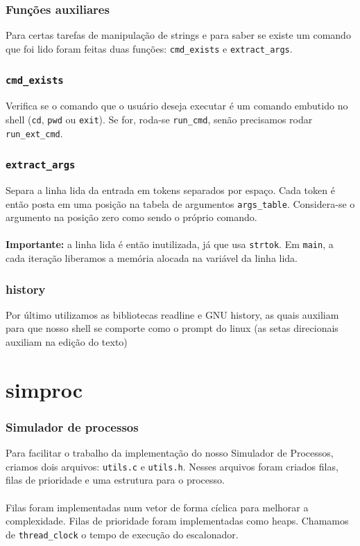 \documentclass{beamer}
\begin{document}
\begin{frame}
  \frametitle{Funções auxiliares}
  Para certas tarefas de manipulação de strings e para saber se existe um comando que foi lido foram feitas duas funções: \texttt{cmd\_exists} e \texttt{extract\_args}. 
\end{frame}


\begin{frame}
  \frametitle{\texttt{cmd\_exists}}
  Verifica se o comando que o usuário deseja executar é um comando embutido no shell (\texttt{cd}, \texttt{pwd} ou \texttt{exit}). Se for, roda-se \texttt{run\_cmd}, senão precisamos rodar \texttt{run\_ext\_cmd}.
\end{frame}


\begin{frame}
  \frametitle{\texttt{extract\_args}}
  Separa a linha lida da entrada em tokens separados por espaço. Cada token é então posta em uma posição na tabela de argumentos \texttt{args\_table}. Considera-se o argumento na posição zero como sendo o próprio comando. \\~\\
  
  \textbf{Importante:} a linha lida é então inutilizada, já que usa \texttt{strtok}. Em \texttt{main}, a cada iteração liberamos a memória alocada na variável da linha lida.
\end{frame}

\begin{frame}
    \frametitle{history}
    Por último utilizamos as bibliotecas readline e GNU history, as quais auxiliam para que nosso shell se comporte como o prompt do linux (as setas direcionais auxiliam na edição do texto)

\end{frame}

\section{simproc}

\begin{frame}
  \frametitle{Simulador de processos}
  Para facilitar o trabalho da implementação do nosso Simulador de Processos, criamos dois arquivos: \texttt{utils.c} e \texttt{utils.h}. Nesses arquivos foram criados filas, filas de prioridade e uma estrutura para o processo. \\~\\

  Filas foram implementadas num vetor de forma cíclica para melhorar a complexidade. Filas de prioridade foram implementadas como heaps. Chamamos de \texttt{thread\_clock} o tempo de execução do escalonador.
\end{frame}
\end{document}
